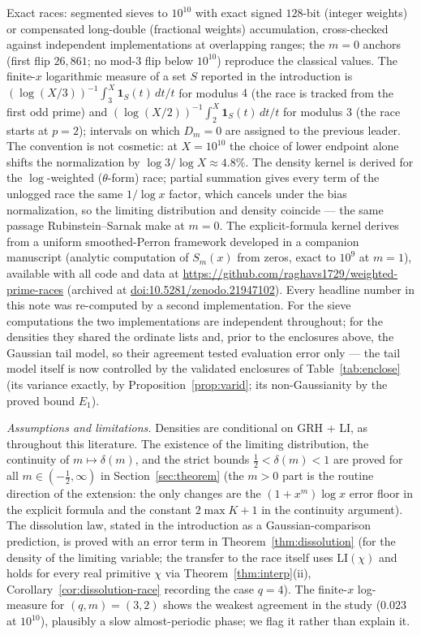 \documentclass[11pt]{article}
\begin{document}
Exact races: segmented
sieves to $10^{10}$ with exact signed $128$-bit (integer weights) or
compensated long-double (fractional weights) accumulation,
cross-checked against independent implementations at overlapping
ranges; the $m=0$ anchors (first flip $26{,}861$; no mod-$3$ flip
below $10^{10}$) reproduce the classical values. The finite-$x$
logarithmic measure of a set $S$ reported in the introduction is
$(\log(X/3))^{-1}\int_3^X\mathbf 1_S(t)\,dt/t$ for modulus $4$ (the
race is tracked from the first odd prime) and
$(\log(X/2))^{-1}\int_2^X\mathbf 1_S(t)\,dt/t$ for modulus $3$ (the
race starts at $p=2$); intervals on which $D_m=0$ are assigned to the
previous leader. The convention is not cosmetic: at $X=10^{10}$ the
choice of lower endpoint alone shifts the normalization by
$\log 3/\log X\approx4.8\%$. The density kernel is
derived for the $\log$-weighted ($\theta$-form) race; partial summation
gives every term of the unlogged race the same $1/\log x$ factor, which
cancels under the bias normalization, so the limiting distribution and
density coincide --- the same passage Rubinstein--Sarnak make at $m=0$. The explicit-formula
kernel derives from a uniform smoothed-Perron framework developed in a
companion manuscript (analytic computation of $S_m(x)$ from zeros,
exact to $10^9$ at $m=1$), available with all code and data at
\url{https://github.com/raghavs1729/weighted-prime-races} (archived at
\href{https://doi.org/10.5281/zenodo.21947102}{doi:10.5281/zenodo.21947102}). Every headline number in this note was re-computed by a second
implementation. For the sieve computations the two implementations are
independent throughout; for the densities they shared the ordinate
lists and, prior to the enclosures above, the Gaussian tail model, so
their agreement tested evaluation error only --- the tail model itself
is now controlled by the validated enclosures of
Table~\ref{tab:enclose} (its variance exactly, by
Proposition~\ref{prop:varid}; its non-Gaussianity by the proved bound
$E_1$).

\emph{Assumptions and limitations.} Densities are conditional on
GRH + LI, as throughout this literature. The existence of the limiting
distribution, the continuity of $m\mapsto\delta(m)$, and the strict
bounds $\tfrac12<\delta(m)<1$ are proved for all
$m\in(-\tfrac12,\infty)$ in Section~\ref{sec:theorem} (the $m>0$ part
is the routine direction of the extension: the only changes are the
$(1+x^m)\log x$ error floor in the explicit formula and the constant
$2\max K+1$ in the continuity argument). The dissolution law,
stated in the introduction as a Gaussian-comparison prediction, is
proved with an error term in
Theorem~\ref{thm:dissolution} (for the density of the limiting
variable; the transfer to the race itself uses LI$(\chi)$ and holds
for every real primitive $\chi$ via Theorem~\ref{thm:interp}(ii),
Corollary~\ref{cor:dissolution-race} recording the case $q=4$). The
finite-$x$ log-measure for $(q,m)=(3,2)$ shows the
weakest agreement in the study ($0.023$ at $10^{10}$), plausibly a
slow almost-periodic phase; we flag it rather than explain it.
\end{document}
